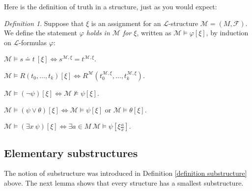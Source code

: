 \documentclass[a4paper, 11pt]{amsart}
\theoremstyle{remark}
\newtheorem{definition}[definition]{Definition}
\newcommand{\cF}{\mathcal F}
\newcommand{\cL}{\mathcal L}
\newcommand{\cM}{\mathcal M}
\newenvironment{enumerate-(1)}{\begin{enumerate}[label={\upshape (\arabic*)}, leftmargin=2pc]}{\end{enumerate}}
\begin{document}
Here is the definition of truth in a structure, just as you would expect: 

\begin{definition} 
\label{definition of truth}  
Suppose that $\xi$ is an assignment for an $\cL$-structure $\cM=(M,\cF)$. 
We define the statement \emph{$\varphi$ holds in $\cM$ for $\xi$}, written as $\cM \models \varphi[\xi]$, by induction on $\cL$-formulas $\varphi$: 
\begin{enumerate-(1)} 
\item 
$\cM \models s \doteq t\ [\xi] \Longleftrightarrow s^{\cM,\xi} = t^{\cM, \xi}$. 
\item 
$\cM \models R(t_0,\dots,t_k)[\xi] \Longleftrightarrow R^\cM(t_0^{\cM,\xi},\dots,t_k^{\cM,\xi})$. 
\item 
$\cM \models (\neg \psi) [\xi] \Longleftrightarrow \cM \not\models\psi [\xi]$. 
\item 
$\cM \models (\psi \vee \theta)[\xi] \Longleftrightarrow \cM \models \psi[\xi]$ or $\cM \models \theta [\xi]$. 
\item 
$\cM \models (\exists x\ \psi) [\xi] \Longleftrightarrow \exists a\in M\ \cM \models\psi [\xi \frac{a}{x}]$. 
\end{enumerate-(1)} 
\end{definition} 




\subsection{Elementary substructures} 
\label{section elementary substructures} 

The notion of substructure was introduced in Definition \ref{definition substructure} above. 
The next lemma shows that every structure has a smallest substructure. 



\end{document}
